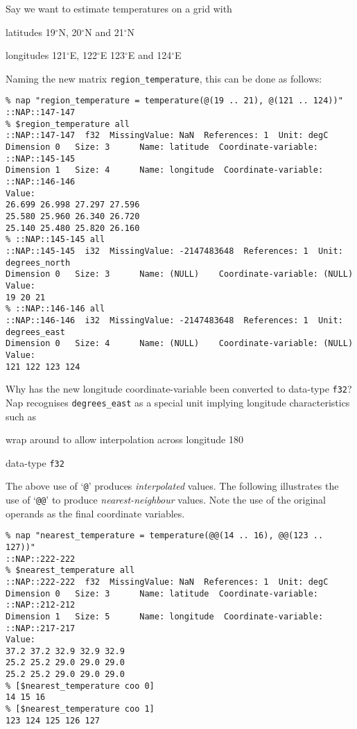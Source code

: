 Say we want to estimate temperatures on a grid with
\begin{bullets}
    \item latitudes 19$^{\circ}$N, 20$^{\circ}$N and 21$^{\circ}$N
    \item longitudes 121$^{\circ}$E, 122$^{\circ}$E 123$^{\circ}$E and 124$^{\circ}$E
\end{bullets}
Naming the new matrix \texttt{region\_temperature}, this can be done as follows:
\begin{verbatim}
% nap "region_temperature = temperature(@(19 .. 21), @(121 .. 124))"
::NAP::147-147
% $region_temperature all
::NAP::147-147  f32  MissingValue: NaN  References: 1  Unit: degC
Dimension 0   Size: 3      Name: latitude  Coordinate-variable: ::NAP::145-145
Dimension 1   Size: 4      Name: longitude  Coordinate-variable: ::NAP::146-146
Value:
26.699 26.998 27.297 27.596
25.580 25.960 26.340 26.720
25.140 25.480 25.820 26.160
% ::NAP::145-145 all
::NAP::145-145  i32  MissingValue: -2147483648  References: 1  Unit: degrees_north
Dimension 0   Size: 3      Name: (NULL)    Coordinate-variable: (NULL)
Value:
19 20 21
% ::NAP::146-146 all
::NAP::146-146  i32  MissingValue: -2147483648  References: 1  Unit: degrees_east
Dimension 0   Size: 4      Name: (NULL)    Coordinate-variable: (NULL)
Value:
121 122 123 124
\end{verbatim}

Why has the new longitude coordinate-variable been converted to
data-type 
  \texttt{f32}? Nap recognises 
  \texttt{degrees\_east} as a special unit implying longitude
  characteristics such as
\begin{bullets}
    \item wrap around to allow interpolation across longitude 180
    \item data-type 
    \texttt{f32}
\end{bullets}

The above use of `\texttt{@}' produces 
  \emph{interpolated} values. The following illustrates the use of
  `\texttt{@@}' to produce 
  \emph{nearest-neighbour} values. Note the use of the original
  operands as the final coordinate variables.
  \begin{verbatim}
% nap "nearest_temperature = temperature(@@(14 .. 16), @@(123 .. 127))"
::NAP::222-222
% $nearest_temperature all
::NAP::222-222  f32  MissingValue: NaN  References: 1  Unit: degC
Dimension 0   Size: 3      Name: latitude  Coordinate-variable: ::NAP::212-212
Dimension 1   Size: 5      Name: longitude  Coordinate-variable: ::NAP::217-217
Value:
37.2 37.2 32.9 32.9 32.9
25.2 25.2 29.0 29.0 29.0
25.2 25.2 29.0 29.0 29.0
% [$nearest_temperature coo 0]
14 15 16
% [$nearest_temperature coo 1]
123 124 125 126 127
\end{verbatim}

